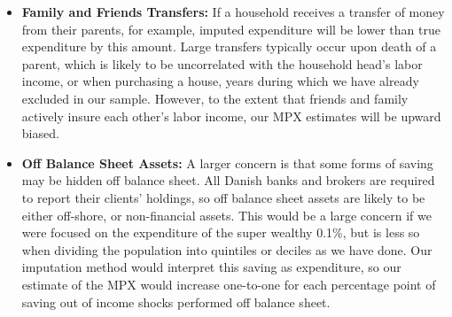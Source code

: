 \documentclass[titlepage]{\econtex}\newcommand{\texname}{ConsumptionHeterogeneity}
\begin{document}
\begin{itemize}
	\item \textbf{Family and Friends Transfers:} If a household receives a transfer of money from their parents, for example, imputed expenditure will be lower than true expenditure by this amount. Large transfers typically occur upon death of a parent, which is likely to be uncorrelated with the household head's labor income, or when purchasing a house, years during which we have already excluded in our sample. However, to the extent that friends and family actively insure each other's labor income, our MPX estimates will be upward biased.
	\item \textbf{Off Balance Sheet Assets:} A larger concern is that some forms of saving may be hidden off balance sheet. All Danish banks and brokers are required to report their clients' holdings, so off balance sheet assets are likely to be either off-shore, or non-financial assets. This would be a large concern if we were focused on the expenditure of the super wealthy 0.1\%, but is less so when dividing the population into quintiles or deciles as we have done. Our imputation method would interpret this saving as expenditure, so our estimate of the MPX would increase one-to-one for each percentage point of saving out of income shocks performed off balance sheet.
\end{itemize}
\end{document}

